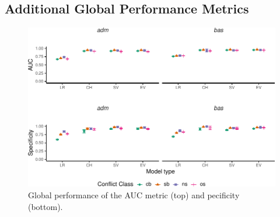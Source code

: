 \documentclass[a4paper,11pt]{article}
\begin{document}
\hypertarget{additional-global-performance-metrics}{%
\subsection*{Additional Global Performance Metrics}\label{additional-global-performance-metrics}}
\begin{figure}[H]

{\centering \includegraphics{thesis_files/figure-latex/appendix-global-auc-1} 

}

\caption[Global performance of the AUC metric and specificity.]{Global performance of the AUC metric (top) and pecificity (bottom).}\label{fig:appendix-global-auc}
\end{figure}
\newpage
\end{document}
